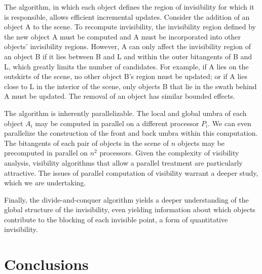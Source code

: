 \documentclass[9pt,twocolumn]{article}
\begin{document}


The algorithm,
in which each object defines the region of invisibility for which it is responsible,
allows efficient incremental updates.
Consider the addition of an object A to the scene.
To recompute invisibility, the invisibility region defined by the new object A
must be computed and A must be incorporated into other objects' invisibility regions.
However, A can only affect the invisibility region of an object B if it lies 
between B and L and within the outer bitangents of B and L,
which greatly limits the number of candidates.
For example, if A lies on the outskirts of the scene, no other object B's region 
must be updated; or if A lies close to L in the interior of the scene, only objects B
that lie in the swath behind A must be updated.
The removal of an object has similar bounded effects.


The algorithm is inherently parallelizable.
The local and global umbra of each object $A_i$ may be computed 
in parallel on a different processor $P_i$.
We can even parallelize the construction of the front and back umbra
within this computation.
The bitangents of each pair of objects in the scene of $n$ objects
may be precomputed in parallel on $n^2$ processors.
Given the complexity of visibility analysis,
visibility algorithms that allow a parallel treatment are particularly attractive.
The issues of parallel computation of visibility warrant a deeper study,
which we are undertaking.

Finally, the divide-and-conquer algorithm yields a deeper understanding
of the global structure of the invisibility,
even yielding information about which objects contribute to the blocking of each 
invisible point, a form of quantitative invisibility.

\section{Conclusions}
\label{sec:conclusions}
\end{document}
